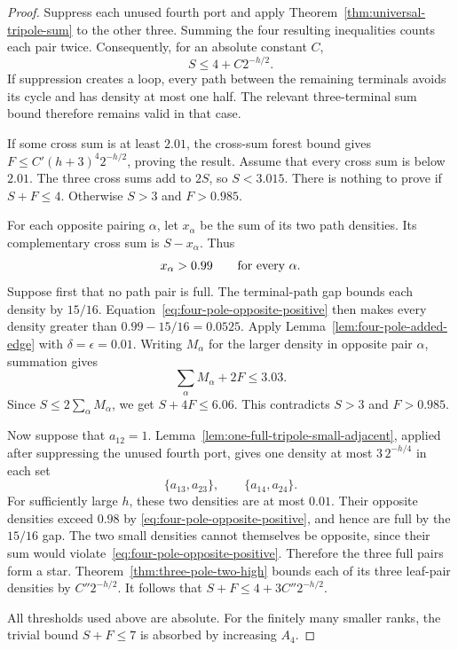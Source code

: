 \begin{proof}
Suppress each unused fourth port and apply
Theorem~\ref{thm:universal-tripole-sum} to the other three.
Summing the four resulting inequalities counts each pair twice.
Consequently, for an absolute constant $C$,
\begin{equation}\label{eq:four-pole-total-paths}
 S\le4+C2^{-h/2}.
\end{equation}
If suppression creates a loop, every path between the remaining terminals
avoids its cycle and has density at most one half.
The relevant three-terminal sum bound therefore remains valid in that case.

If some cross sum is at least $2.01$, the cross-sum forest bound gives
$F\le C'(h+3)^4 2^{-h/2}$, proving the result.
Assume that every cross sum is below $2.01$.
The three cross sums add to $2S$, so $S<3.015$.
There is nothing to prove if $S+F\le4$.
Otherwise $S>3$ and $F>0.985$.

For each opposite pairing $\alpha$, let $x_\alpha$ be the sum of its two
path densities. Its complementary cross sum is $S-x_\alpha$.
Thus
\begin{equation}\label{eq:four-pole-opposite-positive}
 x_\alpha>0.99\qquad\hbox{for every }\alpha.
\end{equation}
Suppose first that no path pair is full.
The terminal-path gap bounds each density by $15/16$.
Equation~\eqref{eq:four-pole-opposite-positive} then makes every density
greater than $0.99-15/16=0.0525$.
Apply Lemma~\ref{lem:four-pole-added-edge} with $\delta=\epsilon=0.01$.
Writing $M_\alpha$ for the larger density in opposite pair $\alpha$, summation gives
\[
 \sum_\alpha M_\alpha+2F\le3.03.
\]
Since $S\le2\sum_\alpha M_\alpha$, we get $S+4F\le6.06$.
This contradicts $S>3$ and $F>0.985$.

Now suppose that $a_{12}=1$.
Lemma~\ref{lem:one-full-tripole-small-adjacent}, applied after suppressing
the unused fourth port, gives one density at most $3\,2^{-h/4}$ in each set
\[
 \{a_{13},a_{23}\},\qquad \{a_{14},a_{24}\}.
\]
For sufficiently large $h$, these two densities are at most $0.01$.
Their opposite densities exceed $0.98$ by
\eqref{eq:four-pole-opposite-positive}, and hence are full by the $15/16$ gap.
The two small densities cannot themselves be opposite, since their sum
would violate~\eqref{eq:four-pole-opposite-positive}.
Therefore the three full pairs form a star.
Theorem~\ref{thm:three-pole-two-high} bounds each of its three leaf-pair
densities by $C''2^{-h/2}$.
It follows that $S+F\le4+3C''2^{-h/2}$.

All thresholds used above are absolute.
For the finitely many smaller ranks, the trivial bound $S+F\le7$ is
absorbed by increasing $A_4$.
\end{proof}


